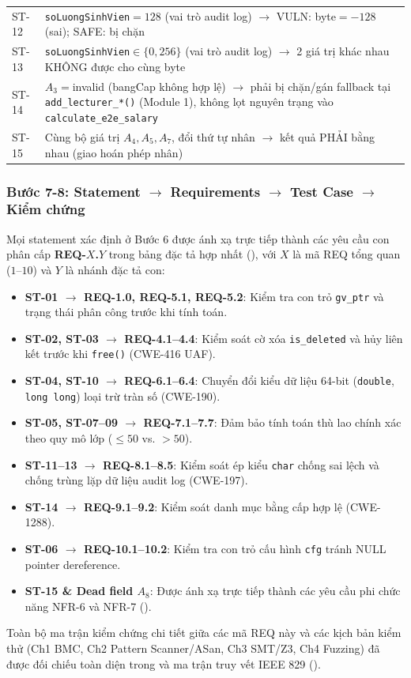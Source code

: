 \begin{table}[H]
\begin{tabularx}{\linewidth}{@{}l X@{}}
    ST-12 & \texttt{soLuongSinhVien}$=128$ (vai trò audit log) $\to$ VULN: byte$=-128$ (sai); SAFE: bị chặn \\
    ST-13 & \texttt{soLuongSinhVien}$\in\{0,256\}$ (vai trò audit log) $\to$ 2 giá trị khác nhau KHÔNG được cho cùng byte \\
    ST-14 & $A_3{=}$invalid (bangCap không hợp lệ) $\to$ phải bị chặn/gán fallback tại \texttt{add\_lecturer\_*()} (Module 1), không lọt nguyên trạng vào \texttt{calculate\_e2e\_salary} \\
    ST-15 & Cùng bộ giá trị $A_4,A_5,A_7$, đổi thứ tự nhân $\to$ kết quả PHẢI bằng nhau (giao hoán phép nhân) \\
    \bottomrule
  \end{tabularx}
\end{table}

\subsubsection*{Bước 7-8: Statement $\to$ Requirements $\to$ Test Case $\to$ Kiểm chứng}

Mọi statement xác định ở Bước 6 được ánh xạ trực tiếp thành các yêu cầu con phân cấp \textbf{REQ-$X$.$Y$} trong bảng đặc tả hợp nhất (), với $X$ là mã REQ tổng quan ($1$--$10$) và $Y$ là nhánh đặc tả con:
\begin{itemize}
  \item \textbf{ST-01 $\to$ REQ-1.0, REQ-5.1, REQ-5.2}: Kiểm tra con trỏ \texttt{gv\_ptr} và trạng thái phân công trước khi tính toán.
  \item \textbf{ST-02, ST-03 $\to$ REQ-4.1--4.4}: Kiểm soát cờ xóa \texttt{is\_deleted} và hủy liên kết trước khi \texttt{free()} (CWE-416 UAF).
  \item \textbf{ST-04, ST-10 $\to$ REQ-6.1--6.4}: Chuyển đổi kiểu dữ liệu 64-bit (\texttt{double}, \texttt{long long}) loại trừ tràn số (CWE-190).
  \item \textbf{ST-05, ST-07--09 $\to$ REQ-7.1--7.7}: Đảm bảo tính toán thù lao chính xác theo quy mô lớp ($\le 50$ vs. $>50$).
  \item \textbf{ST-11--13 $\to$ REQ-8.1--8.5}: Kiểm soát ép kiểu \texttt{char} chống sai lệch và chống trùng lặp dữ liệu audit log (CWE-197).
  \item \textbf{ST-14 $\to$ REQ-9.1--9.2}: Kiểm soát danh mục bằng cấp hợp lệ (CWE-1288).
  \item \textbf{ST-06 $\to$ REQ-10.1--10.2}: Kiểm tra con trỏ cấu hình \texttt{cfg} tránh NULL pointer dereference.
  \item \textbf{ST-15 \& Dead field $A_8$}: Được ánh xạ trực tiếp thành các yêu cầu phi chức năng NFR-6 và NFR-7 ().
\end{itemize}
Toàn bộ ma trận kiểm chứng chi tiết giữa các mã REQ này và các kịch bản kiểm thử (Ch1 BMC, Ch2 Pattern Scanner/ASan, Ch3 SMT/Z3, Ch4 Fuzzing) đã được đối chiếu toàn diện trong  và ma trận truy vết IEEE 829 ().

